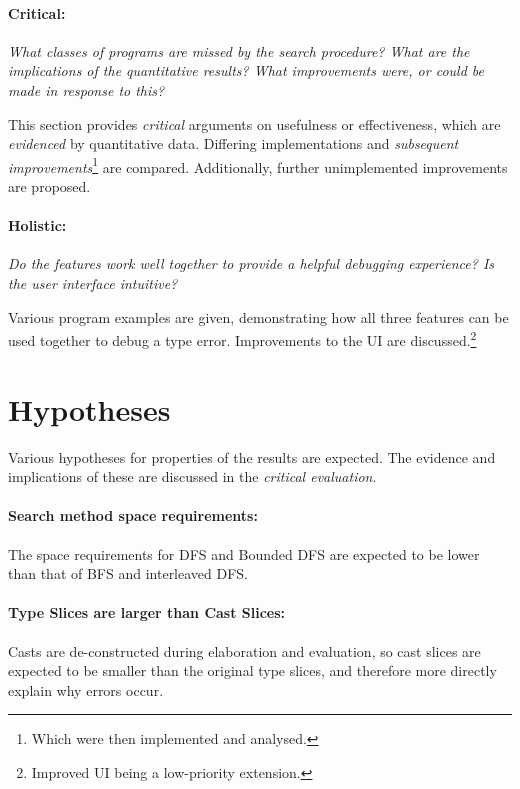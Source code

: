 \paragraph{Critical: } \textit{What \textit{classes} of programs are missed by the search procedure? What are the implications of the \textit{quantitative} results? What improvements were, or could be made in response to this?}

This section provides \textit{critical} arguments on {usefulness} or {effectiveness}, which are \textit{evidenced} by quantitative data. Differing implementations and \textit{subsequent improvements}\footnote{Which were then implemented and analysed.} are compared. Additionally, further unimplemented improvements are proposed.

\paragraph{Holistic: } \textit{Do the features work well together to provide a helpful debugging experience? Is the user interface intuitive?}

Various program examples are given, demonstrating how all three features can be used together to debug a type error. Improvements to the UI are discussed.\footnote{Improved UI being a low-priority extension.} 



\section{Hypotheses}
Various hypotheses for properties of the results are expected. The evidence and implications of these are discussed in the \textit{critical evaluation}.

\paragraph{Search method space requirements: } The space requirements for DFS and Bounded DFS are expected to be lower than that of BFS and interleaved DFS.

\paragraph{Type Slices are larger than Cast Slices: } Casts are de-constructed during elaboration and evaluation, so cast slices are expected to be smaller than the original type slices, and therefore more directly explain why errors occur. 

